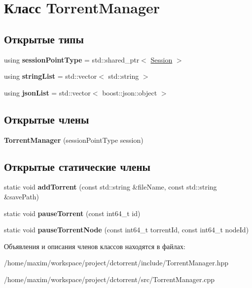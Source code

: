 \hypertarget{class_torrent_manager}{}\section{Класс Torrent\+Manager}
\label{class_torrent_manager}
\subsection*{Открытые типы}
\begin{DoxyCompactItemize}
\item 
\mbox{\label{class_torrent_manager_a696dfbbcd1e56b05c61e7b9e972fac67}} 
using {\bfseries session\+Point\+Type} = std\+::shared\+\_\+ptr$<$ \hyperlink{class_session}{Session} $>$
\item 
\mbox{\label{class_torrent_manager_a0ec9f47e42f2a33e4f83f129040a9403}} 
using {\bfseries string\+List} = std\+::vector$<$ std\+::string $>$
\item 
\mbox{\label{class_torrent_manager_a5e0f9e43eb4fb3261f6d7de86b176e11}} 
using {\bfseries json\+List} = std\+::vector$<$ boost\+::json\+::object $>$
\end{DoxyCompactItemize}
\subsection*{Открытые члены}
\begin{DoxyCompactItemize}
\item 
\mbox{\label{class_torrent_manager_a448fade6680b6a33d5ddf71ee054c1cd}} 
{\bfseries Torrent\+Manager} (session\+Point\+Type session)
\end{DoxyCompactItemize}
\subsection*{Открытые статические члены}
\begin{DoxyCompactItemize}
\item 
\mbox{\label{class_torrent_manager_ae0b16a0a68064229f1f69f154f5b337e}} 
static void {\bfseries add\+Torrent} (const std\+::string \&file\+Name, const std\+::string \&save\+Path)
\item 
\mbox{\label{class_torrent_manager_a001407bb99faad4ece4b1e6d131c8eac}} 
static void {\bfseries pause\+Torrent} (const int64\+\_\+t id)
\item 
\mbox{\label{class_torrent_manager_a0ee14a11a61ee8e343821d329a455ae3}} 
static void {\bfseries pause\+Torrent\+Node} (const int64\+\_\+t torrent\+Id, const int64\+\_\+t node\+Id)
\end{DoxyCompactItemize}


Объявления и описания членов классов находятся в файлах\+:\begin{DoxyCompactItemize}
\item 
/home/maxim/workspace/project/dctorrent/include/Torrent\+Manager.\+hpp\item 
/home/maxim/workspace/project/dctorrent/src/Torrent\+Manager.\+cpp\end{DoxyCompactItemize}
